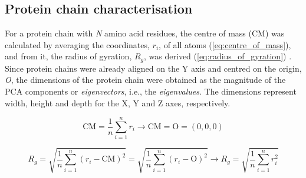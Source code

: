 \subsection{Protein chain characterisation}

For a protein chain with \textit{N} amino acid residues, the centre of mass (CM) was calculated by averaging the coordinates, $r_{i}$, of all atoms (\autoref{eq:centre_of_mass}), and from it, the radius of gyration, $R_{g}$, was derived (\autoref{eq:radius_of_gyration}) \cite{FIXMAN_1962_ROG}. Since protein chains were already aligned on the Y axis and centred on the origin, \textit{O}, the dimensions of the protein chain were obtained as the magnitude of the PCA components or \textit{eigenvectors}, i.e., the \textit{eigenvalues}. The dimensions represent width, height and depth for the X, Y and Z axes, respectively.

\begin{equation}
\text{CM} = \frac{1}{n} \sum_{i=1}^{n} r_i \rightarrow \text{CM} = \text{O} = (0,0,0)
\label{eq:centre_of_mass}
\end{equation}

\vspace{-12pt} %
\vspace{-6pt} %

\begin{equation}
R_g = \sqrt{\frac{1}{n} \sum_{i=1}^{n} (r_i - \text{CM})^2} = \sqrt{\frac{1}{n} \sum_{i=1}^{n} (r_i - \text{O})^2} \rightarrow R_g = \sqrt{\frac{1}{n} \sum_{i=1}^{n} r_i^2}
\label{eq:radius_of_gyration}
\end{equation}

